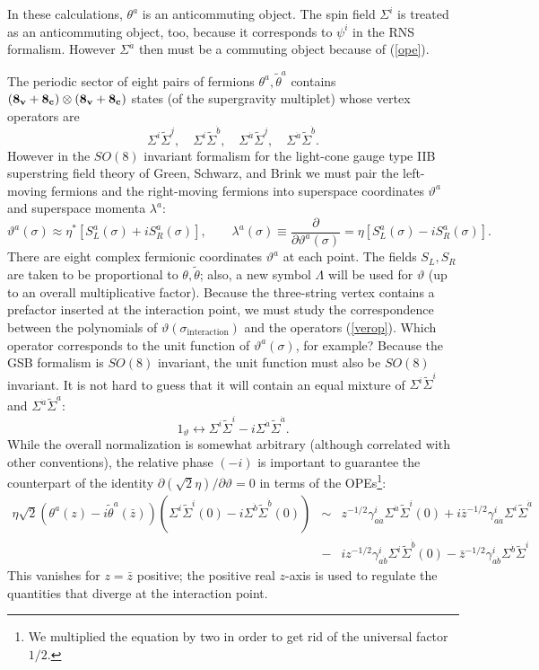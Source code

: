 \documentclass[nohyper,12pt,letterpaper]{JHEP3}
\def \tilde{\widetilde}
\def \eqn#1#2{\begin{equation}#2\label{#1}\end{equation}}
\def \inte{{\mathrm{interaction}}}
\def \da{{\dot a}}
\def \db{{\dot b}}
\def \vt{\vartheta}
\def \ttheta{{\tilde \theta}}
\def \tSigma{{\tilde \Sigma}}
\begin{document}
In these calculations, $\theta^a$ is an anticommuting object. The spin 
field $\Sigma^i$ is treated as an anticommuting object, too, because
it corresponds to $\psi^i$ in the RNS formalism. However $\Sigma^{\dot a}$ 
then must be a commuting object because of (\ref{ope}).

The periodic sector of eight pairs of fermions $\theta^a,\tilde\theta^a$ 
contains 
$({\bf 8_v}+{\bf 8_c})\otimes ({\bf 8_v}+{\bf 8_c})$
states (of the supergravity multiplet)
whose vertex operators are
\eqn{verop}{\Sigma^i\tilde\Sigma^{j},\quad
\Sigma^i\tilde\Sigma^{\dot b},\quad
\Sigma^{\dot a}\tilde\Sigma^{j},\quad
\Sigma^{\dot a}\tilde\Sigma^{\dot b}.}
However in the $SO(8)$ invariant formalism for the light-cone gauge 
type IIB
superstring field theory of Green, Schwarz, and Brink \cite{brinkgs}
we must pair the left-moving fermions and the right-moving fermions
into superspace coordinates $\vt^a$ and superspace momenta 
$\lambda^a$:
\eqn{supde}{\vt^a (\sigma) \approx
\eta^*[S_L^a(\sigma)+i S_R^a (\sigma)],\qquad
\lambda^a(\sigma)
\equiv \frac{\partial}{\partial \vt^a(\sigma)}=\eta[S_L^a
(\sigma)-i S_R^a(\sigma)].}
There are eight complex fermionic coordinates $\vt^a$ at each point. 
The fields $S_L,S_R$ are taken to be proportional to
$\theta,\tilde \theta$; also, 
a new symbol $\Lambda$ will be used for 
$\vartheta$ (up to an overall multiplicative factor).
Because the 
three-string vertex contains a prefactor inserted at the interaction 
point, we must study the correspondence between the polynomials of 
$\vt(\sigma_\inte)$ and the operators (\ref{verop}). Which operator 
corresponds to the unit function of $\vt^a(\sigma)$, for example? Because 
the GSB formalism is $SO(8)$ invariant, the unit function must also be
$SO(8)$ invariant. It is not hard to guess that it will contain an equal 
mixture of $\Sigma^i\tSigma^i$ and $\Sigma^{\da}\tSigma^{\da}$:
\eqn{mixture}{1_{\vt}\leftrightarrow
\Sigma^i\tSigma^i - i \Sigma^{\da}\tSigma^{\da}.}
While the overall normalization is somewhat arbitrary (although correlated 
with other conventions), the relative phase $(-i)$ is important to 
guarantee the counterpart of the identity $\partial (\sqrt{2}\eta)/\partial\vt=0$ in 
terms of the OPEs\footnote{We multiplied the equation by two in order to 
get rid of the universal factor $1/2$.}:
\eqn{opesone}{
\begin{array}{rcl}
\eta\sqrt{2}\left(
\theta^a(z)-i\ttheta^a(\bar z)
\right)
\left(
\Sigma^i\tSigma^i(0)-i\Sigma^\db\tSigma^\db(0)
\right)&\sim&z^{-1/2}\gamma^i_{a\da}\Sigma^\da\tSigma^i(0)
+i \bar z^{-1/2}\gamma^i_{a\da}\Sigma^i\tSigma^\da\\
\quad&-&\!i z^{-1/2}\gamma^i_{a\db}\Sigma^i\tSigma^\db(0)  
-\bar z^{-1/2}\gamma^i_{a\db}\Sigma^\db\tSigma^i
\end{array}
}
This vanishes for $z=\bar z$ positive; the positive real $z$-axis is used 
to regulate the quantities that diverge at the interaction point.
\end{document}
